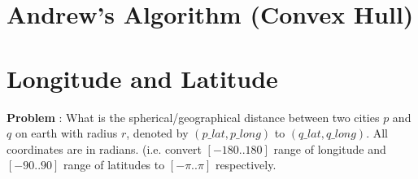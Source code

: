 	\section{Andrew's Algorithm (Convex Hull)}
	
	
	
	\section{Longitude and Latitude}
	
	{\bf Problem} : What is the spherical/geographical distance between two cities $p$ 
	and $q$ on earth with radius $r$, denoted by $(p\_lat,p\_long)$ to $(q\_lat,q\_long)$. 
	All coordinates are in radians. (i.e. convert $[-180..180]$ range of longitude 
	and $[-90..90]$ range of latitudes to $[-\pi..\pi]$ respectively.
	
	
	
